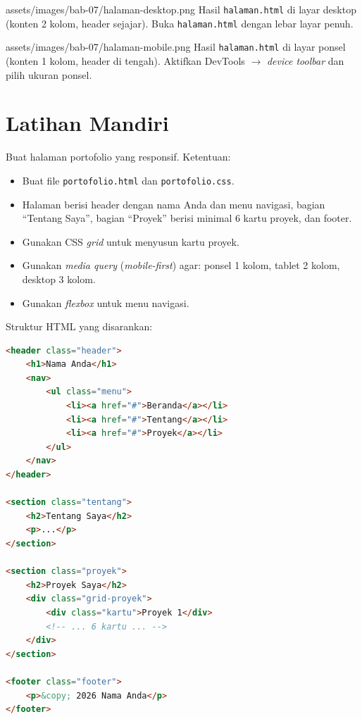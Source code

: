 \begin{tangkapanlayar}
  {assets/images/bab-07/halaman-desktop.png}
  {Hasil \texttt{halaman.html} di layar desktop (konten 2 kolom, header sejajar).}
  {Buka \texttt{halaman.html} dengan lebar layar penuh.}
\end{tangkapanlayar}

\begin{tangkapanlayar}
  {assets/images/bab-07/halaman-mobile.png}
  {Hasil \texttt{halaman.html} di layar ponsel (konten 1 kolom, header di tengah).}
  {Aktifkan DevTools $\rightarrow$ \emph{device toolbar} dan pilih ukuran ponsel.}
\end{tangkapanlayar}

\section{Latihan Mandiri}
\label{sec:grid-latihan}

\begin{latihan}
Buat halaman portofolio yang responsif. Ketentuan:
\begin{itemize}
  \item Buat file \texttt{portofolio.html} dan \texttt{portofolio.css}.
  \item Halaman berisi header dengan nama Anda dan menu navigasi, bagian ``Tentang Saya'', bagian ``Proyek'' berisi minimal 6 kartu proyek, dan footer.
  \item Gunakan CSS \emph{grid} untuk menyusun kartu proyek.
  \item Gunakan \emph{media query} (\emph{mobile-first}) agar: ponsel 1 kolom, tablet 2 kolom, desktop 3 kolom.
  \item Gunakan \emph{flexbox} untuk menu navigasi.
\end{itemize}
\end{latihan}

Struktur HTML yang disarankan:

\begin{lstlisting}[language=HTML, caption={Kerangka portofolio.html}, label={lst:portofolio-kartu}]
<header class="header">
    <h1>Nama Anda</h1>
    <nav>
        <ul class="menu">
            <li><a href="#">Beranda</a></li>
            <li><a href="#">Tentang</a></li>
            <li><a href="#">Proyek</a></li>
        </ul>
    </nav>
</header>

<section class="tentang">
    <h2>Tentang Saya</h2>
    <p>...</p>
</section>

<section class="proyek">
    <h2>Proyek Saya</h2>
    <div class="grid-proyek">
        <div class="kartu">Proyek 1</div>
        <!-- ... 6 kartu ... -->
    </div>
</section>

<footer class="footer">
    <p>&copy; 2026 Nama Anda</p>
</footer>
\end{lstlisting}


